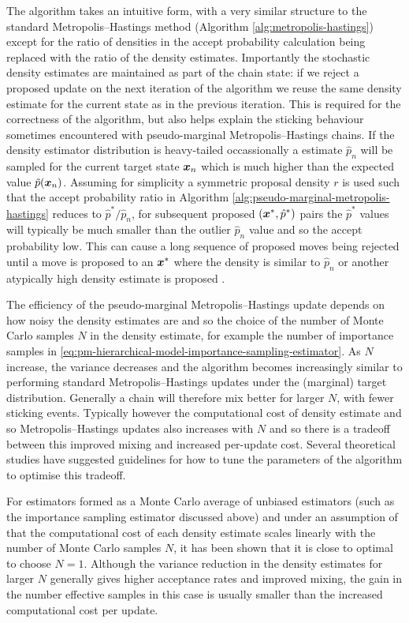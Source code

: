 The algorithm takes an intuitive form, with a very similar structure to the standard Metropolis--Hastings method (Algorithm \ref{alg:metropolis-hastings}) except for the ratio of densities in the accept probability calculation being replaced with the ratio of the density estimates. Importantly the stochastic density estimates are maintained as part of the chain state: if we reject a proposed update on the next iteration of the algorithm we reuse the same density estimate for the current state as in the previous iteration. This is required for the correctness of the algorithm, but also helps explain the sticking behaviour sometimes encountered with pseudo-marginal Metropolis--Hastings chains. If the density estimator distribution is heavy-tailed occassionally a estimate $\hat{p}_n$ will be sampled for the current target state $\boldsymbol{x}_n$ which is much higher than the expected value $\tilde{p}(\boldsymbol{x}_n)$. Assuming for simplicity a symmetric proposal density $r$ is used such that the accept probability ratio in Algorithm \ref{alg:pseudo-marginal-metropolis-hastings} reduces to $\hat{p}^* / \hat{p}_n$, for subsequent proposed $(\boldsymbol{x}^*,\hat{p}^*)$ pairs the $\hat{p}^*$ values will typically be much smaller than the outlier $\hat{p}_n$ value and so the accept probability low. This can cause a long sequence of proposed moves being rejected until a move is proposed to an $\boldsymbol{x}^*$ where the density is similar to $\hat{p}_n$ or another atypically high density estimate is proposed \citep{filippone2014pseudo,andrieu2009pseudo,sherlock2015efficiency}.

The efficiency of the pseudo-marginal Metropolis--Hastings update depends on how noisy the density estimates are and so the choice of the number of Monte Carlo samples $N$ in the density estimate, for example the number of importance samples in \eqref{eq:pm-hierarchical-model-importance-sampling-estimator}. As $N$ increase, the variance decreases and the algorithm becomes increasingly similar to performing standard Metropolis--Hastings updates under the (marginal) target distribution. Generally a chain will therefore mix better for larger $N$, with fewer sticking events. Typically however the computational cost of density estimate and so Metropolis--Hastings updates also increases with $N$ and so there is a tradeoff between this improved mixing and increased per-update cost. Several theoretical studies have suggested guidelines for how to tune the parameters of the algorithm to optimise this tradeoff.

For estimators formed as a Monte Carlo average of unbiased estimators (such as the importance sampling estimator discussed above) and under an assumption of that the computational cost of each density estimate scales linearly with the number of Monte Carlo samples $N$, it has been shown \citep{sherlock2016pseudo,bornn2017use} that it is close to optimal to choose $N = 1$. Although the variance reduction in the density estimates for larger $N$ generally gives higher acceptance rates and improved mixing, the gain in the number effective samples in this case is usually smaller than the increased computational cost per update.

